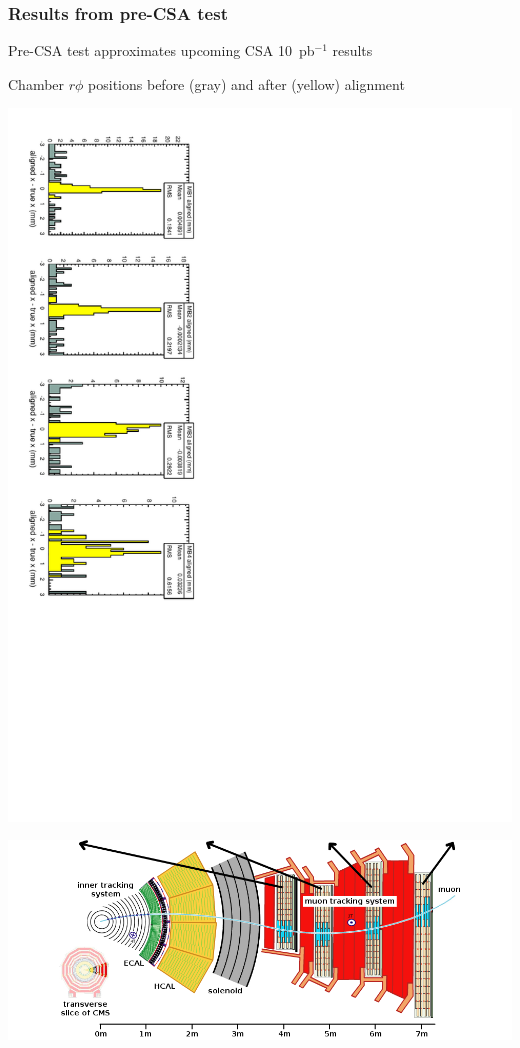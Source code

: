 \documentclass[compress]{beamer}
\begin{document}
\begin{frame}
\frametitle{Results from pre-CSA test}

Pre-CSA test approximates upcoming CSA 10~pb$^{-1}$ results

Chamber $r\phi$ positions before (gray) and after (yellow) alignment

\begin{center}

\includegraphics[height=0.85\linewidth, angle=90]{barrel_184.pdf}

\includegraphics[width=0.85\linewidth]{cms_slice.png}

\end{center}

\end{frame}
\end{document}
